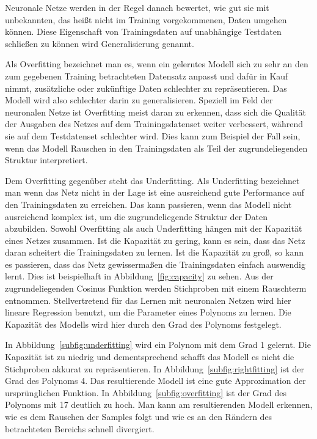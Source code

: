 Neuronale Netze werden in der Regel danach bewertet, wie gut sie mit unbekannten, das heißt nicht im Training vorgekommenen, Daten umgehen können.
Diese Eigenschaft von Trainingsdaten auf unabhängige Testdaten schließen zu können wird Generalisierung genannt. 

Als Overfitting bezeichnet man es, wenn ein gelerntes Modell sich zu sehr an den zum gegebenen Training betrachteten Datensatz anpasst und 
dafür in Kauf nimmt, zusätzliche oder zukünftige Daten schlechter zu repräsentieren.
Das Modell wird also schlechter darin zu generalisieren.
Speziell im Feld der neuronalen Netze ist Overfitting meist daran zu erkennen,
dass sich die Qualität der Ausgaben des Netzes auf dem Trainingsdatenset weiter verbessert,
während sie auf dem Testdatenset schlechter wird.
Dies kann zum Beispiel der Fall sein, wenn das Modell Rauschen in den Trainingsdaten als Teil der zugrundeliegenden Struktur interpretiert. 


Dem Overfitting gegenüber steht das Underfitting. 
Als Underfitting bezeichnet man wenn das Netz nicht in der Lage ist
eine ausreichend gute Performance auf den Trainingsdaten zu erreichen.
Das kann passieren, wenn das Modell nicht ausreichend komplex ist, um die zugrundeliegende Struktur der Daten abzubilden.
Sowohl Overfitting als auch Underfitting hängen mit der Kapazität eines Netzes zusammen.
Ist die Kapazität zu gering, kann es sein, dass das Netz daran scheitert die Trainingsdaten zu lernen.
Ist die Kapazität zu groß, so kann es passieren, dass das Netz gewissermaßen die Trainingsdaten einfach auswendig lernt.
Dies ist beispielhaft in Abbildung~\ref{fig:capacity} zu sehen.
Aus der zugrundeliegenden Cosinus Funktion werden Stichproben mit einem Rauschterm entnommen. 
Stellvertretend für das Lernen mit neuronalen Netzen wird hier lineare Regression benutzt,
um die Parameter eines Polynoms zu lernen.
Die Kapazität des Modells wird hier durch den Grad des Polynoms festgelegt.

In Abbildung~\ref{subfig:underfitting} wird ein Polynom mit dem Grad 1 gelernt.
Die Kapazität ist zu niedrig und dementsprechend schafft das Modell es nicht die Stichproben akkurat zu repräsentieren.
In Abbildung~\ref{subfig:rightfitting} ist der Grad des Polynoms 4.
Das resultierende Modell ist eine gute Approximation der ursprünglichen Funktion.
In Abbildung~\ref{subfig:overfitting} ist der Grad des Polynoms mit 17 deutlich zu hoch.
Man kann am resultierenden Modell erkennen, wie es dem Rauschen der Samples folgt und wie es an den Rändern des betrachteten Bereichs schnell divergiert.

